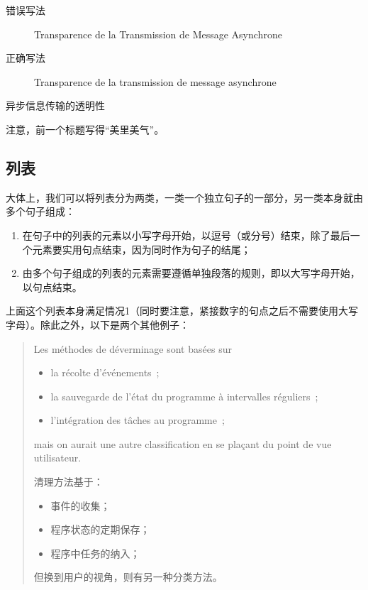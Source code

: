 \begin{description}
    \item[错误写法] Transparence de la Transmission de Message Asynchrone
    \item[正确写法] Transparence de la transmission de message asynchrone
\end{description}

\begin{bil}
    异步信息传输的透明性
\end{bil}

注意，前一个标题写得``美里美气''。

\subsection{列表}

大体上，我们可以将列表分为两类，一类一个独立句子的一部分，另一类本身就由多个句子组成：

\begin{enumerate}
    \item 在句子中的列表的元素以小写字母开始，以逗号（或分号）结束，除了最后一个元素要实用句点结束，因为同时作为句子的结尾；
    \item 由多个句子组成的列表的元素需要遵循单独段落的规则，即以大写字母开始，以句点结束。
\end{enumerate}

上面这个列表本身满足情况1（同时要注意，紧接数字的句点之后不需要使用大写字母）。除此之外，以下是两个其他例子：

\begin{quote}
    Les méthodes de déverminage sont basées sur
    \begin{itemize}
        \item la récolte d'événements~;
        \item la sauvegarde de l'état du programme à intervalles réguliers~;
        \item l'intégration des tâches au programme~;
    \end{itemize}
    mais on aurait une autre classification en se plaçant du point de vue utilisateur.
    \begin{bil}
        清理方法基于：
        \begin{itemize}
            \item 事件的收集；
            \item 程序状态的定期保存；
            \item 程序中任务的纳入；
        \end{itemize}
        但换到用户的视角，则有另一种分类方法。
    \end{bil}
    
\end{quote}

